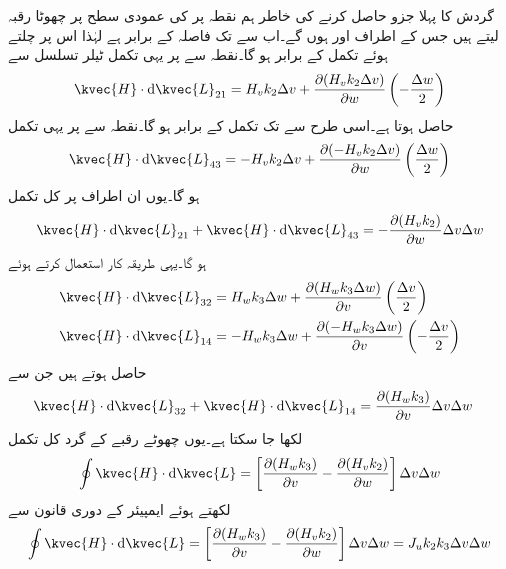 گردش کا پہلا جزو حاصل کرنے کی خاطر ہم نقطہ  پر  کی عمودی سطح پر چھوٹا رقبہ لیتے ہیں جس کے اطراف  اور  ہوں گے۔اب  سے  تک فاصلہ  کے برابر ہے لہٰذا اس پر چلتے ہوئے  تکمل  کے برابر ہو گا۔نقطہ  سے   پر یہی تکمل ٹیلر تسلسل سے
\begin{align*}
\kvec{H} \cdot \dif \kvec{L}_{21}=H_v k_2 \Delta v+\frac{\partial (H_v k_2 \Delta v)}{\partial w}\left(-\frac{\Delta w}{2}\right)
\end{align*}
حاصل ہوتا ہے۔اسی طرح  سے  تک  تکمل  کے برابر ہو گا۔نقطہ  سے   پر یہی تکمل
\begin{align*}
\kvec{H} \cdot \dif \kvec{L}_{43}=-H_v k_2 \Delta v+\frac{\partial (-H_v k_2 \Delta v)}{\partial w}\left(\frac{\Delta w}{2}\right)
\end{align*}
ہو گا۔یوں ان اطراف پر کل تکمل
\begin{align}
\kvec{H} \cdot \dif \kvec{L}_{21}+\kvec{H} \cdot \dif \kvec{L}_{43}=-\frac{\partial (H_v k_2)}{\partial w} \Delta v\Delta w
\end{align}
ہو گا۔یہی طریقہ کار استعمال کرتے ہوئے
\begin{align*}
\kvec{H} \cdot \dif \kvec{L}_{32}&=H_w k_3 \Delta w+\frac{\partial (H_w k_3 \Delta w)}{\partial v}\left(\frac{\Delta v}{2}\right)\\
\kvec{H} \cdot \dif \kvec{L}_{14}&=-H_w k_3 \Delta w+\frac{\partial (-H_w k_3 \Delta w)}{\partial v}\left(-\frac{\Delta v}{2}\right)
\end{align*}
حاصل ہوتے ہیں جن سے
\begin{align}
\kvec{H} \cdot \dif \kvec{L}_{32}+\kvec{H} \cdot \dif \kvec{L}_{14}&=\frac{\partial (H_w k_3)}{\partial v}\Delta v  \Delta w
\end{align}
لکھا جا سکتا ہے۔یوں چھوٹے رقبے کے گرد کل تکمل
\begin{align}
\oint \kvec{H} \cdot \dif \kvec{L}=\left[\frac{\partial (H_w k_3)}{\partial v}-\frac{\partial (H_v k_2)}{\partial w} \right]\Delta v  \Delta w
\end{align}
لکھتے ہوئے ایمپیئر کے دوری قانون سے
\begin{align*}
\oint \kvec{H} \cdot \dif \kvec{L}=\left[\frac{\partial (H_w k_3)}{\partial v}-\frac{\partial (H_v k_2)}{\partial w} \right]\Delta v  \Delta w=J_u {k_2 k_3 \Delta v \Delta w}
\end{align*}
